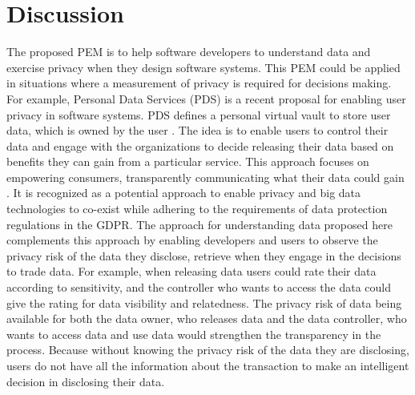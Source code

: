 \documentclass{sigchi}
\begin{document}
\section {Discussion}

The proposed PEM is to help software developers to understand data and exercise privacy when they design software systems. This PEM could be applied in situations where a measurement of privacy is required for decisions making. For example, Personal Data Services (PDS) is a recent proposal for enabling user privacy in software systems. PDS defines a personal virtual vault to store user data, which is owned by the user \cite {rubinstein2012big, tene2012big}. The idea is to enable users to control their data and engage with the organizations to decide releasing their data based on benefits they can gain from a particular service. This approach focuses on empowering consumers, transparently communicating what their data could gain \cite {rubinstein2012big}. It is recognized as a potential approach to enable privacy and big data technologies to co-exist while adhering to the requirements of data protection regulations in the GDPR. The approach for understanding data proposed here complements this approach by enabling developers and users to observe the privacy risk of the data they disclose, retrieve when they engage in the decisions to trade data. For example, when releasing data users could rate their data according to sensitivity, and the controller who wants to access the data could give the rating for data visibility and relatedness. The privacy risk of data being available for both the data owner, who releases data and the data controller, who wants to access data and use data would strengthen the transparency in the process. Because without knowing the privacy risk of the data they are disclosing, users do not have all the information about the transaction to make an intelligent decision in disclosing their data.
\end{document}
